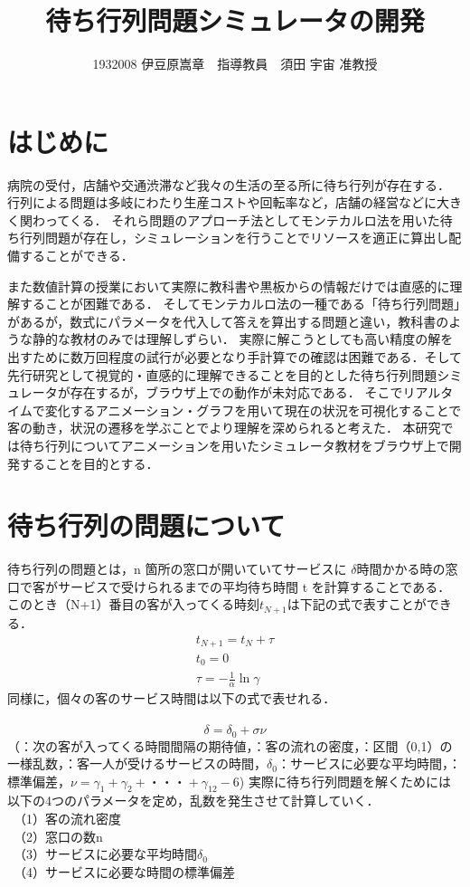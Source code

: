 \documentclass[twocolumn,10pt,a4j]{ltjsarticle}
\title{待ち行列問題シミュレータの開発}
\author{1932008 伊豆原嵩章　指導教員　須田 宇宙 准教授}
\date{}
\begin{document}
\maketitle

\section{はじめに}
病院の受付，店舗や交通渋滞など我々の生活の至る所に待ち行列が存在する．
行列による問題は多岐にわたり生産コストや回転率など，店舗の経営などに大きく関わってくる．
それら問題のアプローチ法としてモンテカルロ法を用いた待ち行列問題が存在し，シミュレーションを行うことでリソースを適正に算出し配備することができる．

また数値計算の授業において実際に教科書や黒板からの情報だけでは直感的に理解することが困難である．
そしてモンテカルロ法の一種である「待ち行列問題」があるが，数式にパラメータを代入して答えを算出する問題と違い，教科書のような静的な教材のみでは理解しずらい．
実際に解こうとしても高い精度の解を出すために数万回程度の試行が必要となり手計算での確認は困難である．そして先行研究として視覚的・直感的に理解できることを目的とした待ち行列問題シミュレータが存在するが，ブラウザ上での動作が未対応である．
そこでリアルタイムで変化するアニメーション・グラフを用いて現在の状況を可視化することで客の動き，状況の遷移を学ぶことでより理解を深められると考えた．
本研究では待ち行列についてアニメーションを用いたシミュレータ教材をブラウザ上で開発することを目的とする．

\section{待ち行列の問題について}
待ち行列の問題とは，n 箇所の窓口が開いていてサービスに $\delta$時間かかる時の窓口で客がサービスで受けられるまでの平均待ち時間 t を計算することである．
このとき（N+1）番目の客が入ってくる時刻$t_{N+1}$は下記の式で表すことができる．\\
\vspace{-11mm}
\begin{eqnarray}
t_{N+1}=t_N+\tau\\
t_0=0\\　
\tau=-\frac{1}{\alpha}\ln\gamma
\end{eqnarray}
同様に，個々の客のサービス時間は以下の式で表せれる．\\　
\vspace{-5mm}
\begin{equation}
\delta=\delta_0+\sigma\nu
\end{equation}
\vspace{-1mm}
（\tau：次の客が入ってくる時間間隔の期待値，\alpha：客の流れの密度，\gamma：区間（0,1）の一様乱数，\delta：客一人が受けるサービスの時間，$\delta_0$：サービスに必要な平均時間，\sigma：標準偏差，$\nu=\gamma_1+\gamma_2+・・・+\gamma_{12}-6$)
実際に待ち行列問題を解くためには以下の4つのパラメータを定め，乱数を発生させて計算していく．\\
　（1）客の流れ密度\alpha\\
　（2）窓口の数n\\
　（3）サービスに必要な平均時間$\delta_0$\\
　（4）サービスに必要な時間の標準偏差\sigma\\
\end{document}
